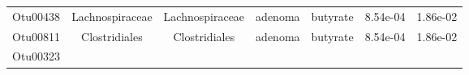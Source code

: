 \documentclass[11pt,]{article}
\begin{document}
\begin{longtable}[]{@{}ccccccc@{}}
\begin{minipage}[t]{0.09\columnwidth}\centering\strut
Otu00438\strut
\end{minipage} & \begin{minipage}[t]{0.17\columnwidth}\centering\strut
Lachnospiraceae\strut
\end{minipage} & \begin{minipage}[t]{0.17\columnwidth}\centering\strut
Lachnospiraceae\strut
\end{minipage} & \begin{minipage}[t]{0.09\columnwidth}\centering\strut
adenoma\strut
\end{minipage} & \begin{minipage}[t]{0.11\columnwidth}\centering\strut
butyrate\strut
\end{minipage} & \begin{minipage}[t]{0.09\columnwidth}\centering\strut
8.54e-04\strut
\end{minipage} & \begin{minipage}[t]{0.09\columnwidth}\centering\strut
1.86e-02\strut
\end{minipage}\tabularnewline
\begin{minipage}[t]{0.09\columnwidth}\centering\strut
Otu00811\strut
\end{minipage} & \begin{minipage}[t]{0.17\columnwidth}\centering\strut
Clostridiales\strut
\end{minipage} & \begin{minipage}[t]{0.17\columnwidth}\centering\strut
Clostridiales\strut
\end{minipage} & \begin{minipage}[t]{0.09\columnwidth}\centering\strut
adenoma\strut
\end{minipage} & \begin{minipage}[t]{0.11\columnwidth}\centering\strut
butyrate\strut
\end{minipage} & \begin{minipage}[t]{0.09\columnwidth}\centering\strut
8.54e-04\strut
\end{minipage} & \begin{minipage}[t]{0.09\columnwidth}\centering\strut
1.86e-02\strut
\end{minipage}\tabularnewline
\begin{minipage}[t]{0.09\columnwidth}\centering\strut
Otu00323\strut
\end{minipage} & \begin{minipage}[t]{0.17\columnwidth}\centering\strut

\end{minipage}
\end{longtable}
\end{document}
